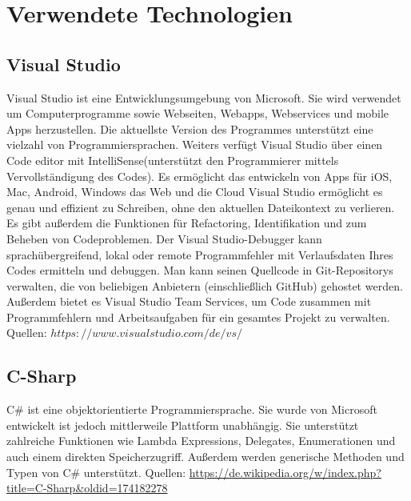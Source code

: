 \chapter{Verwendete Technologien}\label{cha:theoretical-background}

\section{Visual Studio}
Visual Studio ist eine Entwicklungsumgebung von Microsoft. Sie wird verwendet um Computerprogramme sowie Webseiten, Webapps, Webservices und mobile Apps herzustellen. Die aktuellste Version des Programmes unterstützt eine vielzahl von Programmiersprachen.
Weiters verfügt Visual Studio über einen Code editor mit IntelliSense(unterstützt den Programmierer mittels Vervollständigung des Codes). Es ermöglicht das entwickeln von Apps für iOS, Mac, Android, Windows das Web und die Cloud
Visual Studio ermöglicht es genau und effizient zu Schreiben, ohne den aktuellen Dateikontext zu verlieren. Es gibt außerdem die Funktionen für Refactoring, Identifikation und zum Beheben von Codeproblemen.
Der Visual Studio-Debugger kann sprachübergreifend, lokal oder remote Programmfehler mit Verlaufsdaten Ihres Codes ermitteln und debuggen.
Man kann seinen Quellcode in Git-Repositorys verwalten, die von beliebigen Anbietern (einschließlich GitHub) gehostet werden. Außerdem bietet es Visual Studio Team Services, um Code zusammen mit Programmfehlern und Arbeitsaufgaben für ein gesamtes Projekt zu verwalten.
Quellen: \cite{webster_visual_????} $https://www.visualstudio.com/de/vs/$

\section{C-Sharp}
C\# ist eine objektorientierte Programmiersprache. Sie wurde von Microsoft entwickelt ist jedoch mittlerweile Plattform unabhängig. Sie unterstützt zahlreiche Funktionen wie Lambda Expressions, Delegates, Enumerationen und auch einem direkten Speicherzugriff. Außerdem werden generische Methoden und Typen von C\# unterstützt.
Quellen: \cite{_c-sharp_2018} \url{https://de.wikipedia.org/w/index.php?title=C-Sharp&oldid=174182278}

